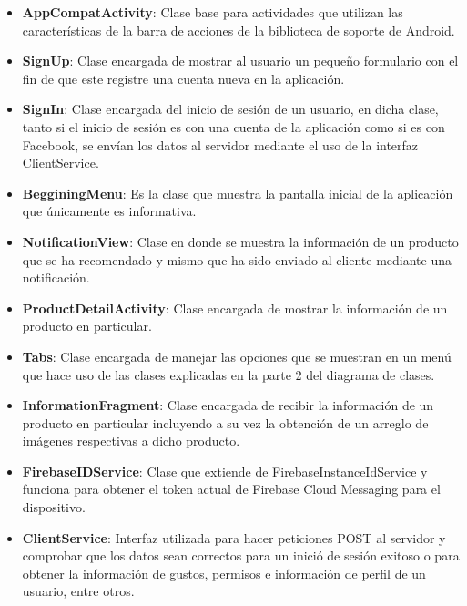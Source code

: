 \begin{itemize}
\item \textbf{AppCompatActivity}: Clase base para actividades que utilizan las características de la barra de acciones de la biblioteca de soporte de Android.
\item \textbf{SignUp}: Clase encargada de mostrar al usuario un pequeño formulario con el fin de que este registre una cuenta nueva en la aplicación.
\item \textbf{SignIn}: Clase encargada del inicio de sesión de un usuario, en dicha clase, tanto si el inicio de sesión es con una cuenta de la aplicación como si es con Facebook, se envían los datos al servidor mediante el uso de la interfaz ClientService.
\item \textbf{BegginingMenu}: Es la clase que muestra la pantalla inicial de la aplicación que únicamente es informativa.
\item \textbf{NotificationView}: Clase en donde se muestra la información de un producto que se ha recomendado y mismo que ha sido enviado al cliente mediante una notificación.
\item \textbf{ProductDetailActivity}: Clase encargada de mostrar la información de un producto en particular.
\item \textbf{Tabs}: Clase encargada de manejar las opciones que se muestran en un menú que hace uso de las clases explicadas en la parte 2 del diagrama de clases. 
\item \textbf{InformationFragment}: Clase encargada de recibir la información de un producto en particular incluyendo a su vez la obtención de un arreglo de imágenes respectivas a dicho producto.
\item \textbf{FirebaseIDService}: Clase que extiende de FirebaseInstanceIdService y funciona para obtener el token actual de Firebase Cloud Messaging para el dispositivo.
\item \textbf{ClientService}: Interfaz utilizada para hacer peticiones POST al servidor y comprobar que los datos sean correctos para un inició de sesión exitoso o para obtener la información de gustos, permisos e información de perfil de un usuario, entre otros.
\end{itemize}


